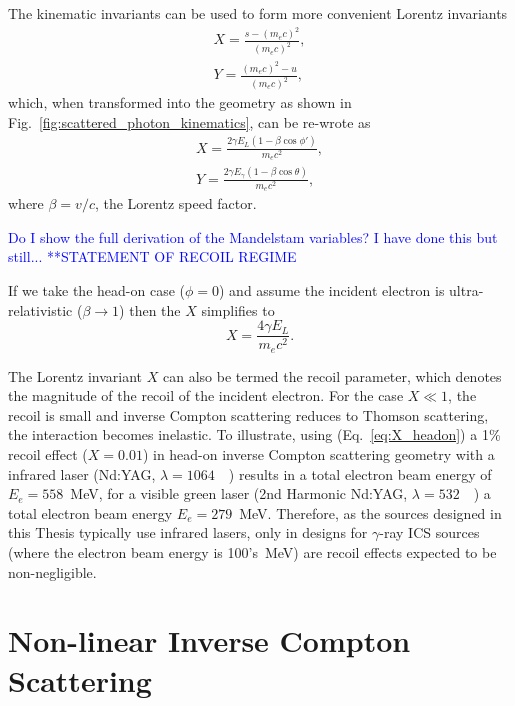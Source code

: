 \documentclass[../main.tex]{subfiles}
\begin{document}
The kinematic invariants can be used to form more convenient Lorentz invariants
\begin{align}
X = \frac{s-\left(m_{e}c\right)^{2}}{\left(m_{e}c\right)^{2}},
\label{eq:X_Mandelstam} \\
Y = \frac{\left(m_{e}c\right)^{2}-u}{\left(m_{e}c\right)^{2}},
\label{eq:Y_Mandelstam}
\end{align}
which, when transformed into the geometry as shown in Fig.~\ref{fig:scattered_photon_kinematics}, can be re-wrote as
\begin{align}
X = \frac{2\gamma E_{L}\left(1-\beta\cos\phi'\right)}{m_{e}c^{2}},
\label{eq:X_geometry} \\
Y = \frac{2\gamma E_{\gamma}\left(1-\beta\cos\theta\right)}{m_{e}c^{2}},
\label{eq:Y_geometry}
\end{align}
where $\beta = v/c$, the Lorentz speed factor.

\textcolor{blue}{Do I show the full derivation of the Mandelstam variables? I have done this but still...}
\textcolor{blue}{**STATEMENT OF RECOIL REGIME}

If we take the head-on case ($\phi = 0$) and  assume the incident electron is ultra-relativistic ($\beta \rightarrow 1$) then the $X$ simplifies to 
\begin{equation}
X = \frac{4\gamma E_{L}}{m_{e}c^{2}}.
\label{eq:X_headon}
\end{equation}

The Lorentz invariant $X$ can also be termed the recoil parameter, which denotes the magnitude of the recoil of the incident electron. For the case $X \ll 1$, the recoil is small and inverse Compton scattering reduces to Thomson scattering, the interaction becomes inelastic. To illustrate, using (Eq.~\ref{eq:X_headon}) a 1\% recoil effect ($X = 0.01$) in head-on inverse Compton scattering geometry with a infrared laser (Nd:YAG, $\lambda = 1064$~\si{\nano\metres}) results in a total electron beam energy of $E_{e} = 558$~\si{\mega\electronvolt}, for a visible green laser (2nd Harmonic Nd:YAG, $\lambda = 532$~\si{\nano\metres}) a total electron beam energy $E_{e} = 279$~\si{\mega\electronvolt}. Therefore, as the sources designed in this Thesis typically use infrared lasers, only in designs for $\gamma$-ray ICS sources (where the electron beam energy is 100's~\si{\mega\electronvolt}) are recoil effects expected to be non-negligible.     

\section{Non-linear Inverse Compton Scattering}
\end{document}
